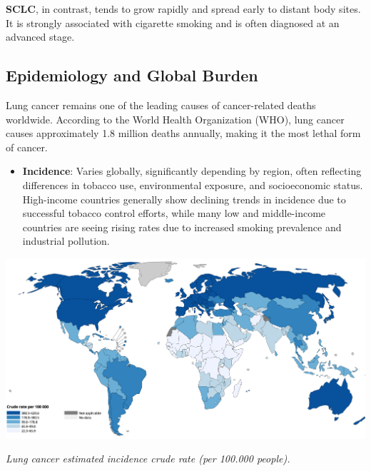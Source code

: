 \textbf{SCLC}, in contrast, tends to grow rapidly and spread early to distant body sites. It is 
strongly associated with cigarette smoking and is often diagnosed at an advanced stage.

\subsection{Epidemiology and Global Burden}
Lung cancer remains one of the leading causes of cancer-related deaths worldwide. According to the 
World Health Organization (WHO), lung cancer causes approximately 1.8 million deaths annually, 
making it the most lethal form of cancer. \cite{who2024}

\begin{itemize}
    \item \textbf{Incidence}: Varies globally, significantly depending by region, often reflecting 
    differences in tobacco use, environmental exposure, and socioeconomic status. High-income 
    countries generally show declining trends in incidence due to successful tobacco control 
    efforts, while many low and middle-income countries are seeing rising rates due to increased 
    smoking prevalence and industrial pollution.
\end{itemize}

\vspace{1em}
\begin{center}
    \includegraphics[width=1.00\textwidth]{../assets/01-overview/lc-crude-rate.png}

    \small\textit{Lung cancer estimated incidence crude rate (per 100.000 people). \cite{who2024}}
\end{center}
\vspace{1em}

